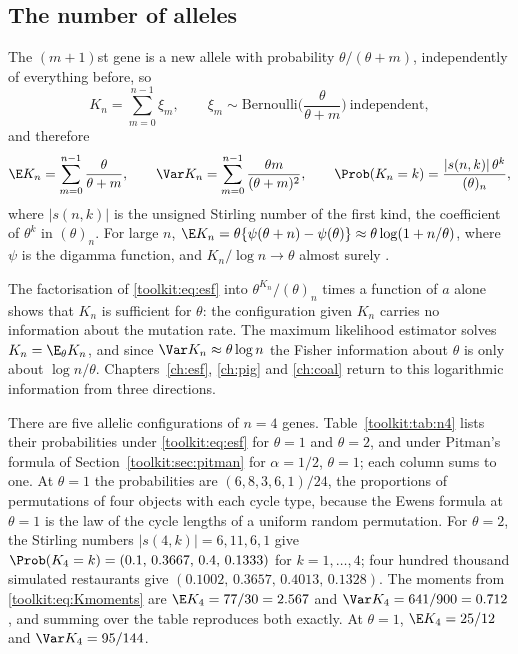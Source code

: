 \subsection{The number of alleles}\label{toolkit:sec:Kn}

The $(m+1)$st gene is a new allele with probability $\theta/(\theta+m)$, independently of
everything before, so
\begin{equation}\label{toolkit:eq:Kn}
K_n=\sum_{m=0}^{n-1}\xi_m,\qquad \xi_m\sim\mathrm{Bernoulli}\Big(\frac{\theta}{\theta+m}\Big)\
\text{independent},
\end{equation}
and therefore
\begin{equation}\label{toolkit:eq:Kmoments}
\E K_n=\sum_{m=0}^{n-1}\frac{\theta}{\theta+m},\qquad
\Var K_n=\sum_{m=0}^{n-1}\frac{\theta m}{(\theta+m)^2},\qquad
\Prob(K_n=k)=\frac{|s(n,k)|\,\theta^k}{(\theta)_n},
\end{equation}
where $|s(n,k)|$ is the unsigned Stirling number of the first kind, the coefficient of $\theta^k$ in
$(\theta)_n$. For large $n$, $\E K_n=\theta\{\psi(\theta+n)-\psi(\theta)\}\approx\theta\log(1+n/\theta)$,
where $\psi$ is the digamma function, and $K_n/\log n\to\theta$ almost surely \citep{toolkit:korwar1973}.

The factorisation of \eqref{toolkit:eq:esf} into $\theta^{K_n}/(\theta)_n$ times a function of
$a$ alone shows that $K_n$ is sufficient for $\theta$: the configuration given $K_n$ carries no
information about the mutation rate. The maximum likelihood estimator solves
$K_n=\E_\theta K_n$, and since $\Var K_n\approx\theta\log n$ the Fisher information about $\theta$
is only about $\log n/\theta$. Chapters~\ref{ch:esf}, \ref{ch:pig} and \ref{ch:coal} return to
this logarithmic information from three directions.

\begin{example}\label{toolkit:ex:n4}
There are five allelic configurations of $n=4$ genes. Table~\ref{toolkit:tab:n4} lists their
probabilities under \eqref{toolkit:eq:esf} for $\theta=1$ and $\theta=2$, and under Pitman's
formula of Section~\ref{toolkit:sec:pitman} for $\alpha=1/2$, $\theta=1$; each column sums to one.
At $\theta=1$ the probabilities are $(6,8,3,6,1)/24$, the proportions of permutations of four
objects with each cycle type, because the Ewens formula at $\theta=1$ is the law of the cycle
lengths of a uniform random permutation. For $\theta=2$, the Stirling numbers $|s(4,k)|=6,11,6,1$
give $\Prob(K_4=k)=(0.1,\,0.3667,\,0.4,\,0.1333)$ for $k=1,\dots,4$; four hundred thousand
simulated restaurants give $(0.1002,\,0.3657,\,0.4013,\,0.1328)$. The moments from
\eqref{toolkit:eq:Kmoments} are $\E K_4=77/30=2.567$ and $\Var K_4=641/900=0.712$, and summing
over the table reproduces both exactly. At $\theta=1$, $\E K_4=25/12$ and $\Var K_4=95/144$.
\end{example}

